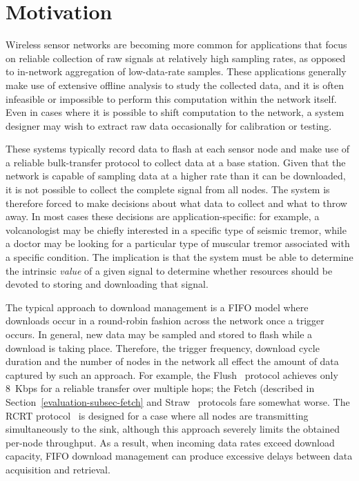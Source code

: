 \section{Motivation}
\label{lance-sec-motivation}

Wireless sensor networks are becoming more common for applications that focus
on reliable collection of raw signals at relatively high sampling rates, as
opposed to in-network aggregation of low-data-rate samples. These
applications generally make use of extensive offline analysis to study the
collected data, and it is often infeasible or impossible to perform this
computation within the network itself. Even in cases where it is possible to
shift computation to the network, a system designer may wish to extract raw
data occasionally for calibration or testing.

These systems typically record data to flash at each sensor node and make use
of a reliable bulk-transfer protocol to collect data at a base station. Given
that the network is capable of sampling data at a higher rate than it can be
downloaded, it is not possible to collect the complete signal from all nodes.
The system is therefore forced to make decisions about what data to collect
and what to throw away. In most cases these decisions are
application-specific: for example, a volcanologist may be chiefly interested
in a specific type of seismic tremor, while a doctor may be looking for a
particular type of muscular tremor associated with a specific condition. The
implication is that the system must be able to determine the intrinsic
\textit{value} of a given signal to determine whether resources should be
devoted to storing and downloading that signal.

The typical approach to download management is a FIFO model where downloads
occur in a round-robin fashion across the network once a trigger occurs. In
general, new data may be sampled and stored to flash while a download is
taking place. Therefore, the trigger frequency, download cycle duration and
the number of nodes in the network all effect the amount of data captured by
such an approach. For example, the Flush~\cite{flush-sensys07} protocol
achieves only 8~Kbps for a reliable transfer over multiple hops; the Fetch
(described in Section~\ref{evaluation-subsec-fetch} and
Straw~\cite{ggb-ipsn07} protocols fare somewhat worse. The RCRT
protocol~\cite{rcrt-sensys07} is designed for a case where all nodes are
transmitting simultaneously to the sink, although this approach severely
limits the obtained per-node throughput. As a result, when incoming data
rates exceed download capacity, FIFO download management can produce
excessive delays between data acquisition and retrieval.

